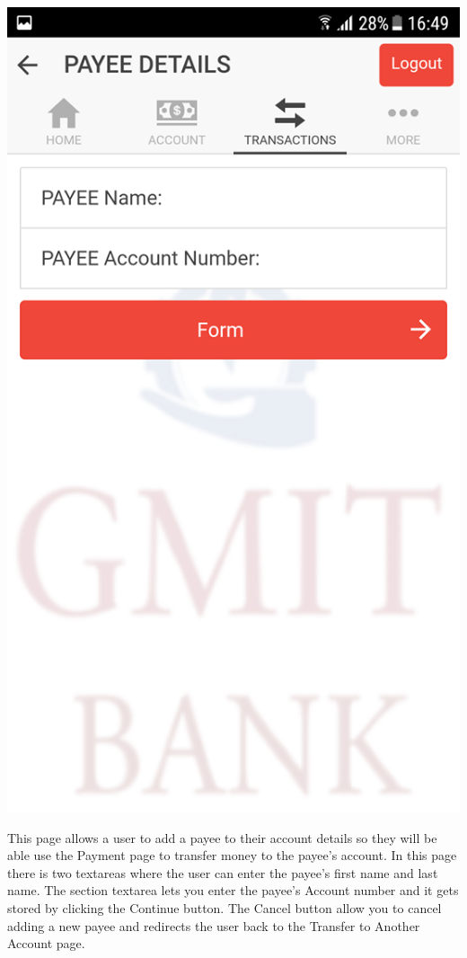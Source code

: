 \begin{center}    
    \includegraphics[scale=0.5]{img/13payeeempty.png}
\end{center}
This page allows a user to add a payee to their account details so they will be able use the Payment page to transfer money to the payee’s account. In this page there is two textareas where the user can enter the payee’s first name and last name. The section textarea lets you enter the payee’s Account number and it gets stored by clicking the Continue button. The Cancel button allow you to cancel adding a new payee and redirects the user back to the Transfer to Another Account page.
